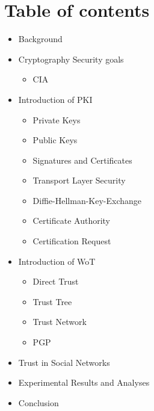 \section{Table of contents}
\begin{frame}
    \begin{itemize}
        \item<1> Background
        \item<1> Cryptography Security goals
            \begin{itemize}
                \item<1> CIA
            \end{itemize}
        \item<1> Introduction of PKI
            \begin{itemize}
                \item<1> Private Keys
                \item<1> Public Keys
                \item<1> Signatures and Certificates
                \item<1> Transport Layer Security
                \item<1> Diffie-Hellman-Key-Exchange
                \item<1> Certificate Authority
                \item<1> Certification Request
            \end{itemize}
        \item<1> Introduction of WoT
            \begin{itemize}
                \item<1> Direct Trust
                \item<1> Trust Tree
                \item<1> Trust Network
                \item<1> PGP
            \end{itemize}
        \item<1> Trust in Social Networks
        \item<1> Experimental Results and Analyses
        \item<1> Conclusion
    \end{itemize}
\end{frame}

